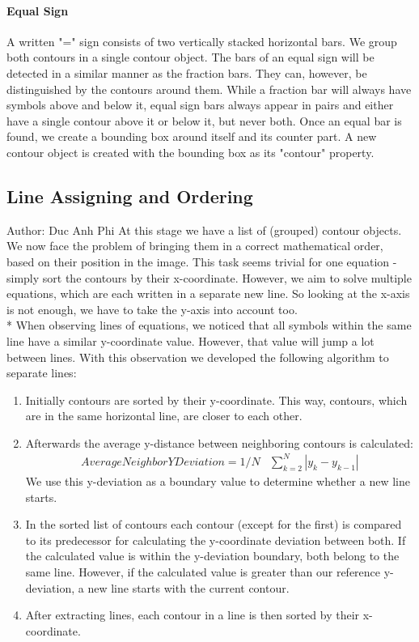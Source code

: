 \documentclass[12pt]{article}
\begin{document}
	\paragraph{Equal Sign}
	A written "=" sign consists of two vertically stacked horizontal bars. We group both contours in a single contour object.
	The bars of an equal sign will be detected in a similar manner as the fraction bars.
	They can, however, be distinguished by the contours around them.
	While a fraction bar will always have symbols above and below it, equal sign bars always appear in pairs
	and either have a single contour above it or below it, but never both.
	Once an equal bar is found, we create a bounding box around itself and its counter part.
	A new contour object is created with the bounding box as its "contour" property.
	
	
	\subsection{Line Assigning and Ordering}
	\small{Author: Duc Anh Phi} \newline \newline
	At this stage we have a list of (grouped) contour objects. We now face the problem of bringing them in a correct mathematical order, based on their position in the image.
	This task seems trivial for one equation - simply sort the contours by their x-coordinate.
	However, we aim to solve multiple equations, which are each written in a separate new line.
	So looking at the x-axis is not enough, we have to take the y-axis into account too.\\* When observing lines of equations, we noticed that all symbols within the same line have a similar y-coordinate value. However, that value will jump a lot between lines. With this observation we developed the following algorithm to separate lines:
	\\
	\begin{enumerate}
		\item Initially contours are sorted by their y-coordinate. This way, contours, which are in the same horizontal line, are closer to each other.
		\item Afterwards the average y-distance between neighboring contours is calculated:\\
		\begin{align}
		Average Neighbor Y Deviation = 1/N &\sum\limits_{k=2}^{N} \left|y_{k} - y_{k-1}\right|
		\end{align}
		We use this y-deviation as a boundary value to determine whether a new line starts.
		\item In the sorted list of contours each contour (except for the first) is compared to its predecessor for calculating the y-coordinate deviation between both. If the calculated value is within the y-deviation boundary, both belong to the same line. However, if the calculated value is greater than our reference y-deviation, a new line starts with the current contour.
		\item After extracting lines, each contour in a line is then sorted by their x-coordinate.
	\end{enumerate}
	
\end{document}
